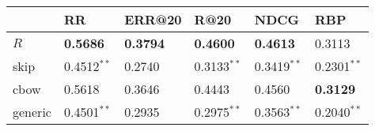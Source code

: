 \begin{tabular}{llllll}
\toprule
{} &               RR &           ERR@20 &           R@20 &             NDCG &              RBP \\
\midrule
$R$     &  \textbf{0.5686} &  \textbf{0.3794} &  \textbf{0.4600} &  \textbf{0.4613} &           0.3113 \\
skip    &    0.4512$^{**}$ &           0.2740 &  0.3133$^{**}$ &    0.3419$^{**}$ &    0.2301$^{**}$ \\
cbow    &           0.5618 &           0.3646 &         0.4443 &           0.4560 &  \textbf{0.3129} \\
generic &    0.4501$^{**}$ &           0.2935 &  0.2975$^{**}$ &    0.3563$^{**}$ &    0.2040$^{**}$ \\
\bottomrule
\end{tabular}
